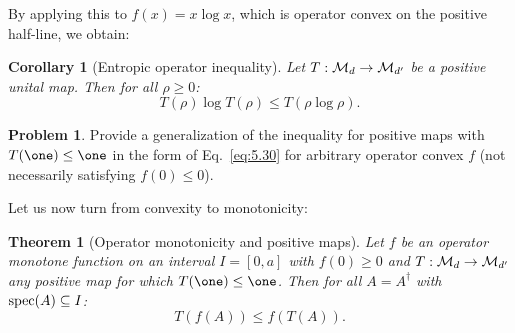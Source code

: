 \documentclass[11pt,a4paper]{article}
\theoremstyle{plain}
\newtheorem{theorem}{Theorem}[section]
\newtheorem{corollary}{Corollary}[section]
\theoremstyle{definition}
\newtheorem{problem}{Problem} %
\theoremstyle{remark}
\numberwithin{equation}{section}
\begin{document}
By applying this to $f(x)=x\log x$, which is operator convex on the positive half-line,
we obtain:

\begin{corollary}[Entropic operator inequality]
    Let $T:\mathcal{M}_d\to \mathcal{M}_{d'}$ be a positive unital map. Then for all $\rho\ge 0$:
    \begin{equation}\label{eq:5.33}
        T(\rho)\log T(\rho) \le T(\rho\log \rho).
    \end{equation}
\end{corollary}

\begin{problem}
Provide a generalization of the inequality for positive maps with $T(\one)\le \one$ in
the form of Eq.~\eqref{eq:5.30} for arbitrary operator convex $f$ (not necessarily
satisfying $f(0)\le 0$).
\end{problem}

Let us now turn from convexity to monotonicity:

\begin{theorem}[Operator monotonicity and positive maps]
    Let $f$ be an operator monotone function on an interval $I=[0,a]$ with $f(0)\ge 0$
    and $T:\mathcal{M}_d \to \mathcal{M}_{d'}$ any positive map for which $T(\one)\le \one$. Then for
    all $A=A^\dagger$ with $\operatorname{spec}(A)\subseteq I$:
    \begin{equation}\label{eq:5.34}
        T(f(A)) \le f(T(A)).
    \end{equation}
\end{theorem}
\end{document}
